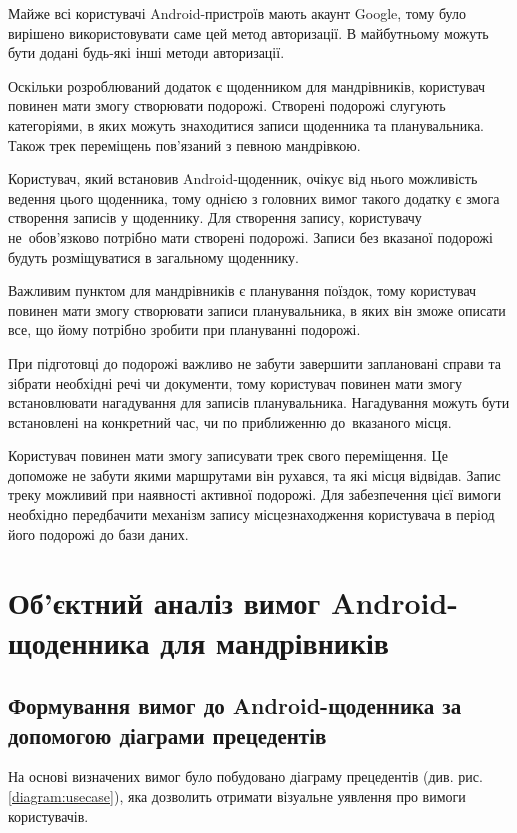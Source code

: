 \documentclass[../main.tex]{subfiles}
\begin{document}
Майже всі користувачі Android-пристроїв мають акаунт Google, тому було вирішено використовувати саме цей метод авторизації. В майбутньому можуть бути додані будь-які інші методи авторизації.

Оскільки розроблюваний додаток є щоденником для мандрівників, користувач повинен мати змогу створювати подорожі. Створені подорожі слугують категоріями, в яких можуть знаходитися записи щоденника та планувальника. Також трек переміщень пов'язаний з певною мандрівкою.

Користувач, який встановив Android-щоденник, очікує від нього можливість ведення цього щоденника, тому однією з головних вимог такого додатку є змога створення записів у щоденнику. Для створення запису, користувачу не~обов'язково потрібно мати створені подорожі. Записи без вказаної подорожі будуть розміщуватися в загальному щоденнику.

Важливим пунктом для мандрівників є планування поїздок, тому користувач повинен мати змогу створювати записи планувальника, в яких він зможе описати все, що йому потрібно зробити при плануванні подорожі.

При підготовці до подорожі важливо не забути завершити заплановані справи та зібрати необхідні речі чи документи, тому користувач повинен мати змогу встановлювати нагадування для записів планувальника. Нагадування можуть бути встановлені на конкретний час, чи по приближенню до~вказаного місця.

Користувач повинен мати змогу записувати трек свого переміщення. Це допоможе не забути якими маршрутами він рухався, та  які місця відвідав. Запис треку можливий при наявності активної подорожі. Для забезпечення цієї вимоги необхідно передбачити механізм запису місцезнаходження користувача в період його подорожі до бази даних.

\section{Об'єктний аналіз вимог Android-щоденника для мандрівників}

\subsection{Формування вимог до Android-щоденника за допомогою діаграми прецедентів}
На основі визначених вимог було побудовано діаграму прецедентів (див. рис. \ref{diagram:usecase}), яка дозволить отримати візуальне уявлення про вимоги користувачів.
\end{document}
